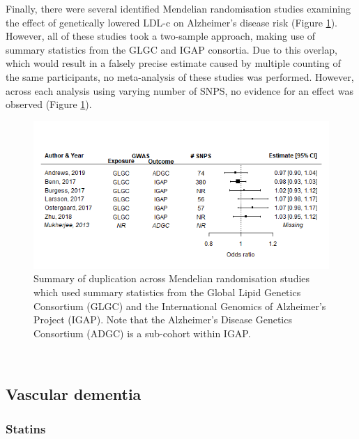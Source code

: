 \documentclass[a4paper, twoside]{templates/ociamthesis}
\begin{document}
Finally, there were several identified Mendelian randomisation studies examining the effect of genetically lowered LDL-c on Alzheimer's disease risk (Figure \ref{fig:mrDuplication}). However, all of these studies took a two-sample approach, making use of summary statistics from the GLGC and IGAP consortia. Due to this overlap, which would result in a falsely precise estimate caused by multiple counting of the same participants, no meta-analysis of these studies was performed. However, across each analysis using varying number of SNPS, no evidence for an effect was observed (Figure \ref{fig:mrDuplication}).





\begin{figure}[H]

{\centering \includegraphics[width=0.8\linewidth]{figures/sys-rev/mrDuplication} 

}

\caption[Summary of duplication across two sample Mendelian randomisation studies]{Summary of duplication across Mendelian randomisation studies which used summary statistics from the Global Lipid Genetics Consortium (GLGC) and the International Genomics of Alzheimer's Project (IGAP). Note that the Alzheimer's Disease Genetics Consortium (ADGC) is a sub-cohort within IGAP.}\label{fig:mrDuplication}
\end{figure}

~

\hypertarget{sys-rev-res-VaD}{%
\subsection{Vascular dementia}\label{sys-rev-res-VaD}}

\hypertarget{statins-2}{%
\subsubsection{Statins}\label{statins-2}}
\end{document}
